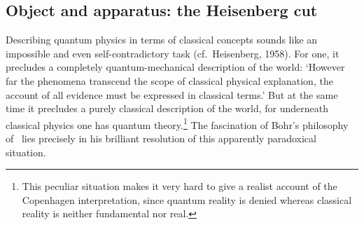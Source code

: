 \documentclass[12pt]{article}
\begin{document}
  \subsection{Object and apparatus: the Heisenberg cut}\label{HC}
Describing quantum physics in terms of classical concepts 
 sounds like an impossible and even self-contradictory task (cf.\ Heisenberg, 1958).  For one, it precludes a completely quantum-mechanical description of the world: `However far the phenomena transcend the scope of classical physical explanation, the account of all evidence must be expressed in classical terms.' But at the same time it precludes a purely classical description of the world, for underneath classical physics one has quantum theory.\footnote{This peculiar situation makes it very hard to give a realist account of the Copenhagen interpretation, since quantum reality is denied whereas classical reality is neither fundamental nor real.} The fascination of Bohr's philosophy of \qm\ lies precisely in his brilliant resolution of this apparently paradoxical situation.  
 
\end{document}
